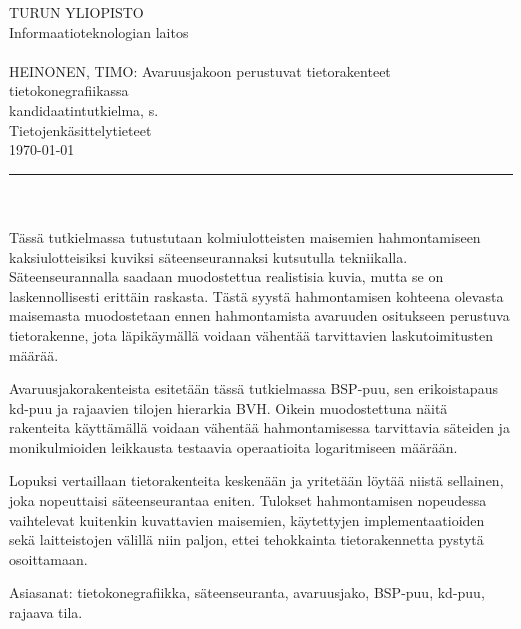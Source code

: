 ﻿\setlength{\hoffset}{-1in} \setlength{\oddsidemargin}{4cm} \addtolength{\textwidth}{1.3cm} \addtolength{\textheight}{1cm} \setlength{\voffset}{-1in}
\thispagestyle{empty}  %

\noindent
TURUN YLIOPISTO\\
Informaatioteknologian laitos\\
\\
HEINONEN, TIMO: Avaruusjakoon perustuvat tietorakenteet tietokonegrafiikassa\\
kandidaatintutkielma, \pageref{LastPage} s.\\
Tietojenkäsittelytieteet\\
\today\\
\rule{\textwidth}{.2mm}\\
\\
Tässä tutkielmassa tutustutaan kolmiulotteisten maisemien hahmontamiseen kaksiulotteisiksi kuviksi säteenseurannaksi kutsutulla tekniikalla. Säteenseurannalla saadaan muodostettua realistisia kuvia, mutta se on laskennollisesti erittäin raskasta. Tästä syystä hahmontamisen kohteena olevasta maisemasta muodostetaan ennen hahmontamista avaruuden ositukseen perustuva tietorakenne, jota läpikäymällä voidaan vähentää tarvittavien laskutoimitusten määrää.

\vspace{4mm}

Avaruusjakorakenteista esitetään tässä tutkielmassa BSP-puu, sen erikoistapaus kd-puu ja rajaavien tilojen hierarkia BVH. Oikein muodostettuna näitä rakenteita käyttämällä voidaan vähentää hahmontamisessa tarvittavia säteiden ja monikulmioiden leikkausta testaavia operaatioita logaritmiseen määrään. 

\vspace{4mm}

Lopuksi vertaillaan tietorakenteita keskenään ja yritetään löytää niistä sellainen, joka nopeuttaisi säteenseurantaa eniten. Tulokset hahmontamisen nopeudessa vaihtelevat kuitenkin kuvattavien maisemien, käytettyjen implementaatioiden sekä laitteistojen välillä niin paljon, ettei tehokkainta tietorakennetta pystytä osoittamaan.


\vfill
\vspace{4mm}Asiasanat: tietokonegrafiikka, säteenseuranta, avaruusjako, BSP-puu, kd-puu, rajaava tila.

